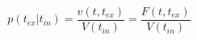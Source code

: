 \begin{equation}
p(t_{ex}|t_{in})  = \frac{v(t,t_{ex})}{V(t_{in})}= \frac{F(t,t_{ex})}{V(t_{in})}
\end{equation}